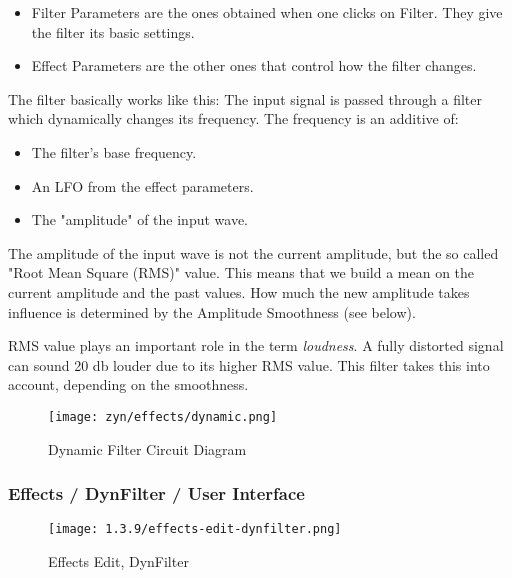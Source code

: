    \begin{itemize}
      \item Filter Parameters are the ones obtained when one clicks on Filter.
         They give the filter its basic settings.
      \item Effect Parameters are the other ones that control how the filter
         changes.
   \end{itemize}

   The filter basically works like this: The input signal is passed through a
   filter which dynamically changes its frequency. The frequency is an
   additive of:

   \begin{itemize}
      \item The filter’s base frequency.
      \item An LFO from the effect parameters.
      \item The "amplitude" of the input wave.
   \end{itemize}

   The amplitude of the input wave is not the current amplitude, but the so
   called "Root Mean Square (RMS)" value. This means that we build a mean on
   the current amplitude and the past values. How much the new amplitude
   takes influence is determined by the Amplitude Smoothness (see below).

   RMS value plays an important role in the term \textsl{loudness}.
   A fully distorted signal can sound 20 db louder due to its higher RMS value.
   This filter takes this into account, depending on the smoothness.

\begin{figure}[H]
   \centering 
   \texttt{[image: zyn/effects/dynamic.png]}
   \caption{Dynamic Filter Circuit Diagram}
   \label{fig:dynfilter_circuit_diagram}
\end{figure}

\subsubsection{Effects / DynFilter / User Interface}
\label{subsubsec:effects_edit_dynfilter_ui}

\begin{figure}[H]
   \centering 
   \texttt{[image: 1.3.9/effects-edit-dynfilter.png]}
   \caption{Effects Edit, DynFilter}
   \label{fig:effects_edit_dynfilter}
\end{figure}

